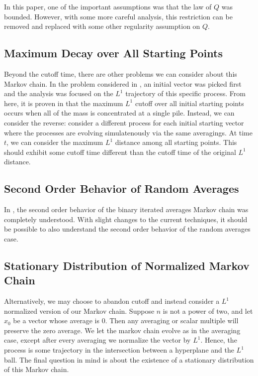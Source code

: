 \documentclass[12pt]{article}
\begin{document}
In this paper, one of the important assumptions was that the law of $Q$ was bounded. However, with some more careful analysis, this restriction can be removed and replaced with some other regularity assumption on $Q$. 

\subsection{Maximum Decay over All Starting Points}
Beyond the cutoff time, there are other problems we can consider about this Markov chain. In the problem considered in \cite{chatterjee2021phase}, an initial vector was picked first and the analysis was focused on the $L^1$ trajectory of this specific process. From here, it is proven in \cite{chatterjee2021phase} that the maximum $L^1$ cutoff over all initial starting points occurs when all of the mass is concentrated at a single pile. Instead, we can consider the reverse: consider a different process for each initial starting vector where the processes are evolving simulatenously via the same averagings. At time $t$, we can consider the maximum $L^1$ distance among all starting points. This should exhibit some cutoff time different than the cutoff time of the original $L^1$ distance.

\subsection{Second Order Behavior of Random Averages}

In \cite{chatterjee2021phase}, the second order behavior of the binary iterated averages Markov chain was completely understood. With slight changes to the current techniques, it should be possible to also understand the second order behavior of the random averages case. 

\subsection{Stationary Distribution of Normalized Markov Chain}

Alternatively, we may choose to abandon cutoff and instead consider a $L^1$ normalized version of our Markov chain. Suppose $n$ is not a power of two, and let $x_0$ be a vector whose average is $0$. Then any averaging or scalar multiple will preserve the zero average. We let the markov chain evolve as in the averaging case, except after every averaging we normalize the vector by $L^1$. Hence, the process is some trajectory in the intersection between a hyperplane and the $L^1$ ball. The final question in mind is about the existence of a stationary distribution of this Markov chain. 
\end{document}
